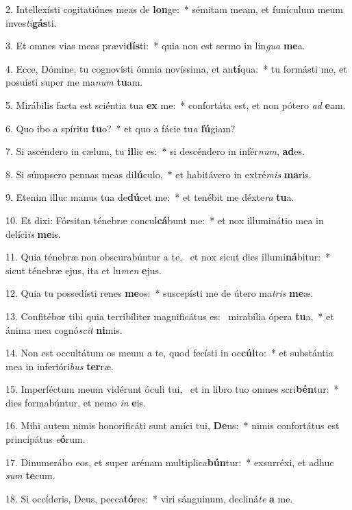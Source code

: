 2. Intellexísti cogitatiónes meas de \textbf{lon}ge:~*  sémitam meam, et funículum meum inves\textit{ti}\textbf{gás}ti.\

3. Et omnes vias meas prævi\textbf{dís}ti:~*  quia non est sermo in lin\textit{gua} \textbf{me}a.\

4. Ecce, Dómine, tu cognovísti ómnia novíssima, et an\textbf{tí}qua:~*  tu formásti me, et posuísti super me ma\textit{num} \textbf{tu}am.\

5. Mirábilis facta est sciéntia tua \textbf{ex} me:~*  confortáta est, et non pótero \textit{ad} \textbf{e}am.\

6. Quo ibo a spíritu \textbf{tu}o?~*  et quo a fácie tu\textit{a} \textbf{fú}giam?\

7. Si ascéndero in cælum, tu \textbf{il}lic es:~*  si descéndero in infér\textit{num}, \textbf{ad}es.\

8. Si súmpsero pennas meas di\textbf{lú}culo,~*  et habitávero in extré\textit{mis} \textbf{ma}ris.\

9. Etenim illuc manus tua de\textbf{dú}cet me:~*  et tenébit me déxte\textit{ra} \textbf{tu}a.\

10. Et dixi: Fórsitan ténebræ concul\textbf{cá}bunt me:~*  et nox illuminátio mea in delíci\textit{is} \textbf{me}is.\

11. Quia ténebræ non obscurabúntur a te, \dag\  et nox sicut dies illumi\textbf{ná}bitur:~*  sicut ténebræ ejus, ita et lu\textit{men} \textbf{e}jus.\

12. Quia tu possedísti renes \textbf{me}os:~*  suscepísti me de útero ma\textit{tris} \textbf{me}æ.\

13. Confitébor tibi quia terribíliter magnificátus es: \dag\  mirabília ópera \textbf{tu}a,~*  et ánima mea cognó\textit{scit} \textbf{ni}mis.\

14. Non est occultátum os meum a te, quod fecísti in oc\textbf{cúl}to:~*  et substántia mea in inferióri\textit{bus} \textbf{ter}ræ.\

15. Imperféctum meum vidérunt óculi tui, \dag\  et in libro tuo omnes scri\textbf{bén}tur:~*  dies formabúntur, et nemo \textit{in} \textbf{e}is.\

16. Mihi autem nimis honorificáti sunt amíci tui, \textbf{De}us:~*  nimis confortátus est principátus \textit{e}\textbf{ó}rum.\

17. Dinumerábo eos, et super arénam multiplica\textbf{bún}tur:~*  exsurréxi, et adhuc \textit{sum} \textbf{te}cum.\

18. Si occíderis, Deus, pecca\textbf{tó}res:~*  viri sánguinum, decliná\textit{te} \textbf{a} me.\

